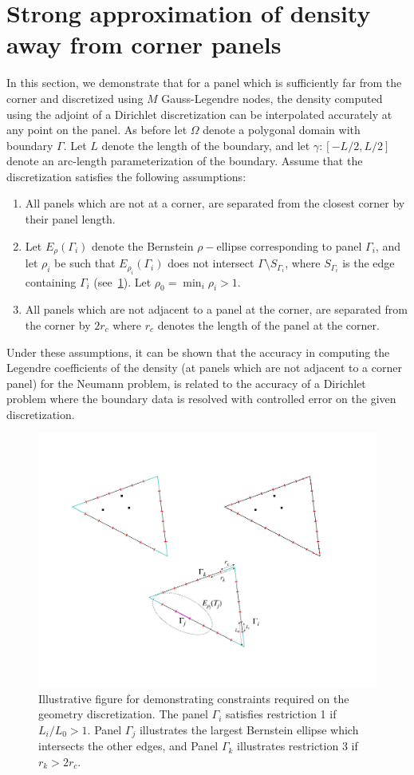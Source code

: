 \documentclass[12pt]{article}
\begin{document}
\section{Strong approximation of density away from corner panels}
\label{sec:appb}
In this section, we demonstrate that for a panel which is sufficiently far from the corner and  discretized using $M$ Gauss-Legendre nodes, the density computed using the adjoint of a Dirichlet discretization can be interpolated 
accurately at any point on the panel. As before let $\Omega$ denote a polygonal domain with boundary $\Gamma$. Let
$L$ denote the length of the boundary, and let $\gamma: [-L/2,L/2]$ denote an arc-length parameterization of the boundary.
Assume that the discretization satisfies the following assumptions:
\begin{enumerate}
\item All panels which are not at a corner, are separated from the closest corner by their panel length.
\item Let $E_{\rho}(\Gamma_{i})$ denote the Bernstein $\rho-$ellipse corresponding to panel $\Gamma_{i}$, and let $\rho_{i}$ 
be such that $E_{\rho_{i}}(\Gamma_{i})$ does not intersect $\Gamma \setminus S_{\Gamma_{i}}$, where 
$S_{\Gamma_{i}}$ is the edge containing $\Gamma_{i}$ (see~\cref{fig:illus-cons}). Let $\rho_{0} = \min_{i} \rho_{i} >1$.
\item All panels which are not adjacent to a panel at the corner, are separated from the corner by $2r_{c}$ where $r_{c}$ 
denotes the length of the panel at the corner.
\end{enumerate}
Under these assumptions, it can be shown that the accuracy in computing the
Legendre coefficients of the density (at panels which are not adjacent to a corner panel) for the Neumann problem, is related to the accuracy 
of a Dirichlet problem where the boundary data is resolved with controlled error on the given discretization.
\begin{figure}
\begin{center}
\includegraphics[width=0.3\linewidth]{media/geom-restriction-illus}
\caption{Illustrative figure for demonstrating constraints required on the geometry discretization. The panel $\Gamma_{i}$ satisfies restriction 1 if $L_{i}/L_{0}>1$. Panel $\Gamma_{j}$ illustrates the largest Bernstein ellipse which intersects the other edges, and Panel $\Gamma_{k}$ illustrates restriction 3 if $r_{k}>2r_{c}$. }
\label{fig:illus-cons}
\end{center}
\end{figure}
\end{document}

